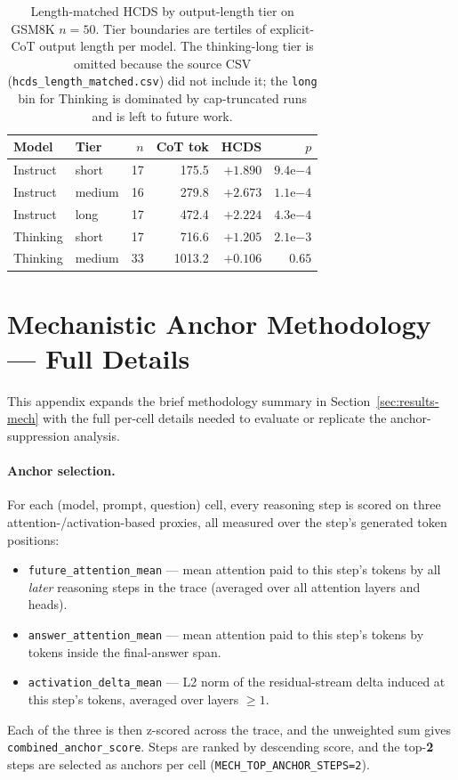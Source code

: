 \documentclass{article}
\theoremstyle{plain}
\theoremstyle{definition}
\theoremstyle{remark}
\begin{document}
\begin{table}[!htbp]
\caption{Length-matched HCDS by output-length tier on GSM8K $n{=}50$.
Tier boundaries are tertiles of explicit-CoT output length per model.
The thinking-long tier is omitted because the source CSV
(\texttt{hcds\_length\_matched.csv}) did not include it; the
\texttt{long} bin for Thinking is dominated by cap-truncated runs and
is left to future work.}
\label{tab:length-matched}
\centering
\small
\setlength{\tabcolsep}{3pt}
\renewcommand{\arraystretch}{1.08}
\begin{tabular}{@{}llrrrr@{}}
\toprule
Model & Tier & $n$ & CoT tok & HCDS & $p$ \\
\midrule
Instruct & short  & 17 & 175.5  & $+1.890$ & $9.4\mathrm{e}{-4}$ \\
Instruct & medium & 16 & 279.8  & $+2.673$ & $1.1\mathrm{e}{-4}$ \\
Instruct & long   & 17 & 472.4  & $+2.224$ & $4.3\mathrm{e}{-4}$ \\
Thinking & short  & 17 & 716.6  & $+1.205$ & $2.1\mathrm{e}{-3}$ \\
Thinking & medium & 33 & 1013.2 & $+0.106$ & $0.65$ \\
\bottomrule
\end{tabular}
\end{table}

\section{Mechanistic Anchor Methodology --- Full Details}
\label{app:mech-details}

This appendix expands the brief methodology summary in
Section~\ref{sec:results-mech} with the full per-cell details
needed to evaluate or replicate the anchor-suppression analysis.

\paragraph{Anchor selection.}
For each (model, prompt, question) cell, every reasoning step is
scored on three attention-/activation-based proxies, all measured
over the step's generated token positions:
\begin{itemize}
\item \texttt{future\_attention\_mean} --- mean attention paid to this
  step's tokens by all \emph{later} reasoning steps in the trace
  (averaged over all attention layers and heads).
\item \texttt{answer\_attention\_mean} --- mean attention paid to this
  step's tokens by tokens inside the final-answer span.
\item \texttt{activation\_delta\_mean} --- L2 norm of the residual-stream
  delta induced at this step's tokens, averaged over layers $\geq 1$.
\end{itemize}
Each of the three is then z-scored across the trace, and the
unweighted sum gives \texttt{combined\_anchor\_score}. Steps are ranked
by descending score, and the top-\textbf{2} steps are selected as
anchors per cell (\texttt{MECH\_TOP\_ANCHOR\_STEPS=2}).
\end{document}
